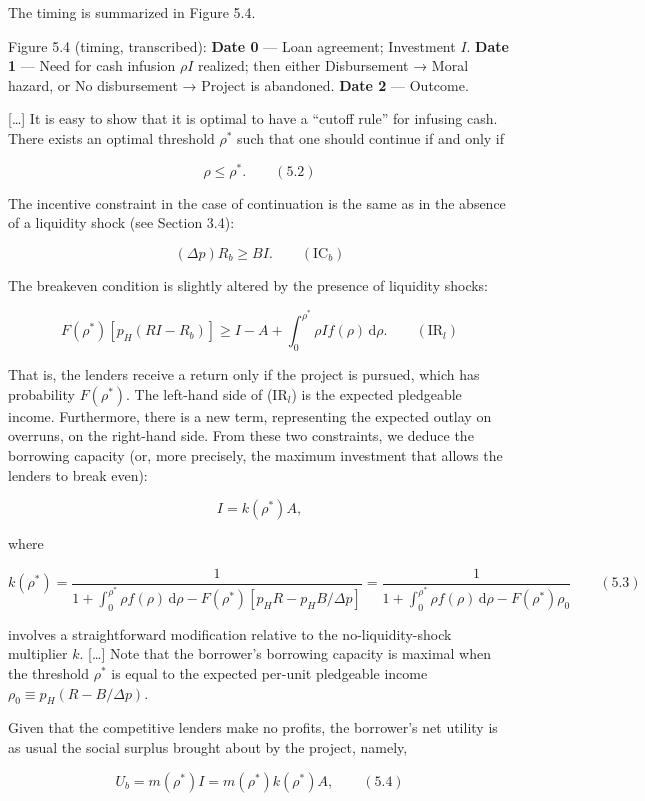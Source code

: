 \documentclass[11pt,a4paper]{article}
\begin{document}
The timing is summarized in Figure 5.4.

Figure 5.4 (timing, transcribed): \textbf{Date 0} --- Loan agreement; Investment \(I\). \textbf{Date
1} --- Need for cash infusion \(\rho I\) realized; then either Disbursement → Moral hazard, or No
disbursement → Project is abandoned. \textbf{Date 2} --- Outcome.

{[}\ldots{]} It is easy to show that it is optimal to have a ``cutoff rule'' for infusing cash.
There exists an optimal threshold \(\rho^*\) such that one should continue if and only if

\[\rho \leqslant \rho^*. \qquad (5.2)\]

The incentive constraint in the case of continuation is the same as in the absence of a liquidity
shock (see Section 3.4):

\[(\Delta p)R_b \geqslant BI. \qquad (\text{IC}_b)\]

The breakeven condition is slightly altered by the presence of liquidity shocks:

\[F(\rho^*)[p_H(RI - R_b)] \geqslant I - A + \int_0^{\rho^*}\rho If(\rho)\,\mathrm{d}\rho. \qquad (\text{IR}_l)\]

That is, the lenders receive a return only if the project is pursued, which has probability
\(F(\rho^*)\). The left-hand side of (IR\(_l\)) is the expected pledgeable income. Furthermore,
there is a new term, representing the expected outlay on overruns, on the right-hand side. From
these two constraints, we deduce the borrowing capacity (or, more precisely, the maximum investment
that allows the lenders to break even):

\[I = k(\rho^*)A,\]

where

\[k(\rho^*) = \frac{1}{1 + \int_0^{\rho^*}\rho f(\rho)\,\mathrm{d}\rho - F(\rho^*)[p_HR - p_HB/\Delta p]} = \frac{1}{1 + \int_0^{\rho^*}\rho f(\rho)\,\mathrm{d}\rho - F(\rho^*)\rho_0} \qquad (5.3)\]

involves a straightforward modification relative to the no-liquidity-shock multiplier \(k\).
{[}\ldots{]} Note that the borrower's borrowing capacity is maximal when the threshold \(\rho^*\) is
equal to the expected per-unit pledgeable income \(\rho_0 \equiv p_H(R - B/\Delta p)\).

Given that the competitive lenders make no profits, the borrower's net utility is as usual the
social surplus brought about by the project, namely,

\[U_b = m(\rho^*)I = m(\rho^*)k(\rho^*)A, \qquad (5.4)\]
\end{document}
